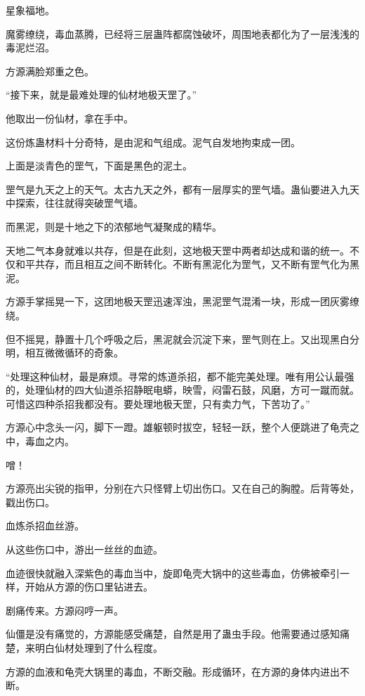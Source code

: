 
\begin{this_body}

星象福地。

魔雾缭绕，毒血蒸腾，已经将三层蛊阵都腐蚀破坏，周围地表都化为了一层浅浅的毒泥烂沼。

方源满脸郑重之色。

“接下来，就是最难处理的仙材地极天罡了。”

他取出一份仙材，拿在手中。

这份炼蛊材料十分奇特，是由泥和气组成。泥气自发地拘束成一团。

上面是淡青色的罡气，下面是黑色的泥土。

罡气是九天之上的天气。太古九天之外，都有一层厚实的罡气墙。蛊仙要进入九天中探索，往往就得突破罡气墙。

而黑泥，则是十地之下的浓郁地气凝聚成的精华。

天地二气本身就难以共存，但是在此刻，这地极天罡中两者却达成和谐的统一。不仅和平共存，而且相互之间不断转化。不断有黑泥化为罡气，又不断有罡气化为黑泥。

方源手掌摇晃一下，这团地极天罡迅速浑浊，黑泥罡气混淆一块，形成一团灰雾缭绕。

但不摇晃，静置十几个呼吸之后，黑泥就会沉淀下来，罡气则在上。又出现黑白分明，相互微微循环的奇象。

“处理这种仙材，最是麻烦。寻常的炼道杀招，都不能完美处理。唯有用公认最强的，处理仙材的四大仙道杀招静眠电蟒，映雪，闷雷石鼓，风磨，方可一蹴而就。可惜这四种杀招我都没有。要处理地极天罡，只有卖力气，下苦功了。”

方源心中念头一闪，脚下一蹬。雄躯顿时拔空，轻轻一跃，整个人便跳进了龟壳之中，毒血之内。

噌！

方源亮出尖锐的指甲，分别在六只怪臂上切出伤口。又在自己的胸膛。后背等处，戳出伤口。

血炼杀招血丝游。

从这些伤口中，游出一丝丝的血迹。

血迹很快就融入深紫色的毒血当中，旋即龟壳大锅中的这些毒血，仿佛被牵引一样，开始从方源的伤口里钻进去。

剧痛传来。方源闷哼一声。

仙僵是没有痛觉的，方源能感受痛楚，自然是用了蛊虫手段。他需要通过感知痛楚，来明白仙材处理到了什么程度。

方源的血液和龟壳大锅里的毒血，不断交融。形成循环，在方源的身体内进出不断。


\end{this_body}
